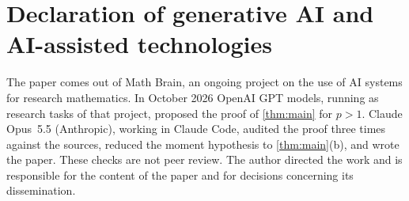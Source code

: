 \documentclass[11pt]{amsart}
\theoremstyle{remark}
\begin{document}
\section*{Declaration of generative AI and AI-assisted technologies}
The paper comes out of Math Brain, an ongoing project on the use of AI systems for research mathematics. In October 2026 OpenAI GPT models, running as research tasks of that project, proposed the proof of \cref{thm:main} for $p>1$. Claude Opus~5.5 (Anthropic), working in Claude Code, audited the proof three times against the sources, reduced the moment hypothesis to \cref{thm:main}(b), and wrote the paper. These checks are not peer review. The author directed the work and is responsible for the content of the paper and for decisions concerning its dissemination.



\end{document}
